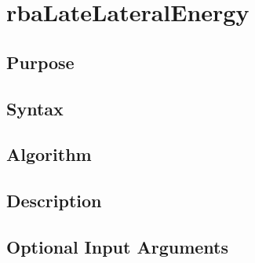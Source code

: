 
\chapter{rbaLateLateralEnergy} %
\label{cha:rbaLateLateralEnergy} %

\section{Purpose} %
\label{sec:rbaLateLateralEnergy_purpose}



\section{Syntax} %
\label{sec:rbaLateLateralEnergy_syntax}




\section{Algorithm} %
\label{sec:rbaLateLateralEnergy_algorithm}



\section{Description} %
\label{sec:rbaLateLateralEnergy_description}



\section{Optional Input Arguments} %
\label{sec:rbaLateLateralEnergy_optional_input_arguments}




